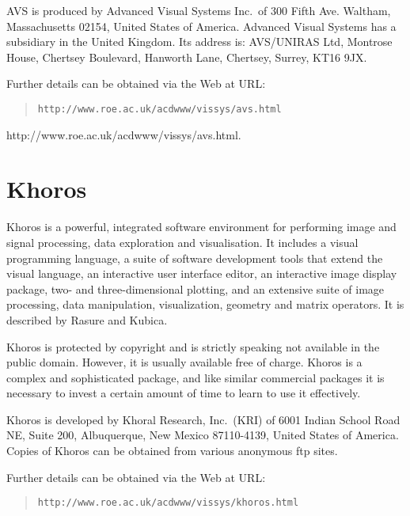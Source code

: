 AVS is produced by Advanced Visual Systems Inc.\ of 300 Fifth Ave.
Waltham, Massachusetts 02154, United States of America. Advanced Visual
Systems has a subsidiary in the United Kingdom. Its address is:
AVS/UNIRAS Ltd, Montrose House, Chertsey Boulevard, Hanworth Lane, 
Chertsey, Surrey, KT16 9JX.

\begin{latex}
Further details can be obtained via the Web at URL:

\begin{quote}
{\tt http://www.roe.ac.uk/acdwww/vissys/avs.html}
\end{quote}
\end{latex}

\begin{htmlonly}
{http://www.roe.ac.uk/acdwww/vissys/avs.html}.
\end{htmlonly}


\section{Khoros \label{KHOROS}  }

Khoros is a powerful, integrated software environment for performing
image and signal processing, data exploration and visualisation. It
includes a visual programming language, a suite of software development 
tools that extend the visual language, an interactive user interface 
editor, an interactive image display package, two- and three-dimensional
 plotting, and an extensive suite of image processing, data manipulation, 
visualization, geometry and matrix operators. It is described by
Rasure and Kubica\cite{RASURE}.

Khoros is protected by copyright and is strictly speaking not available
in the public domain. However, it is usually available free of charge.
Khoros is a complex and sophisticated package, and like similar
commercial packages it is necessary to invest a certain amount of time
to learn to use it effectively.

Khoros is developed by Khoral Research, Inc.\ (KRI) of 6001 Indian
School Road NE, Suite 200, Albuquerque, New Mexico 87110-4139, United
States of America. Copies of Khoros can be obtained from various anonymous 
ftp sites.

\begin{latex}
Further details can be obtained via the Web at URL:

\begin{quote}
{\tt http://www.roe.ac.uk/acdwww/vissys/khoros.html}
\end{quote}
\end{latex}

